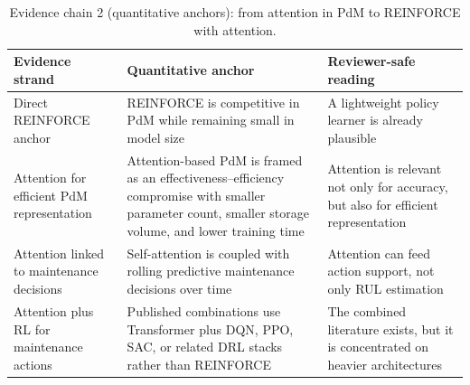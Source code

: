 \documentclass[refree,sn-basic]{sn-jnl} %
\begin{document}
\begin{table}[t]
        \centering
        \small
        \setlength{\tabcolsep}{4pt}
        \begin{tabular}{p{} p{} p{}}
                \toprule
                Evidence strand & Quantitative anchor & Reviewer-safe reading \\
                \midrule
                Direct REINFORCE anchor & REINFORCE is competitive in PdM while remaining small in model size \cite{Siraskar2025} & A lightweight policy learner is already plausible \\
                Attention for efficient PdM representation & Attention-based PdM is framed as an effectiveness--efficiency compromise with smaller parameter count, smaller storage volume, and lower training time \cite{DeLuca2023} & Attention is relevant not only for accuracy, but also for efficient representation \\
                Attention linked to maintenance decisions & Self-attention is coupled with rolling predictive maintenance decisions over time \cite{Xia2022} & Attention can feed action support, not only RUL estimation \\
                Attention plus RL for maintenance actions & Published combinations use Transformer plus DQN, PPO, SAC, or related DRL stacks rather than REINFORCE \cite{Zhao2024, Zhang2023, Guo2026} & The combined literature exists, but it is concentrated on heavier architectures \\
                \bottomrule
        \end{tabular}
        \caption{Evidence chain 2 (quantitative anchors): from attention in PdM to REINFORCE with attention.}
        \label{tab:evidence_chain2_quant}
\end{table}
\end{document}
